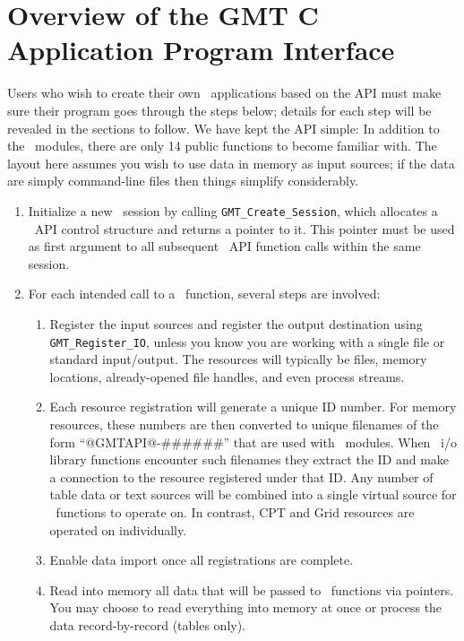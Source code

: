\documentclass{report}
\begin{document}
\chapter{Overview of the GMT C Application Program Interface}

Users who wish to create their own \GMT\ applications based on the API
must make sure their program goes through the steps below; details
for each step will be revealed in the sections to follow.  We have kept the
API simple: In addition to the \GMT\ modules, there are only 14 public functions to become familiar with.
The layout here assumes you wish to use data in memory as input sources; if the data are simply
command-line files then things simplify considerably.

\begin{enumerate}
\item Initialize a new \GMT\ session by calling \texttt{GMT\_Create\_Session}, which
allocates a \GMT\ API control structure and returns a pointer to it.  This pointer must be used
as first argument to all subsequent \GMT\ API function calls within the same session.
\item For each intended call to a \GMT\ function, several steps are involved:
\begin{enumerate}
\item Register the input sources and register the output destination
using \texttt{GMT\_Register\_IO}, unless you know you are working with a single file
or standard input/output.
The resources will typically be files, memory locations, already-opened file handles,
and even process streams.
\item Each resource registration will generate a unique ID number.  For memory resources, these numbers are
then converted to unique filenames of the form ``@GMTAPI@-\#\#\#\#\#\#'' that are used with \GMT\ modules.  When
\GMT\ i/o library functions encounter such filenames they extract the ID and make a connection
to the resource registered under that ID.  Any number of table data or text sources
will be combined into a single virtual source for \GMT\ functions to operate on.
In contrast, CPT and Grid resources are operated on individually.
\item Enable data import once all registrations are complete.
\item Read into memory all data that will be passed to \GMT\ functions via pointers.  You may choose
	to read everything into memory at once or process the data record-by-record (tables only).

\end{enumerate}
\end{enumerate}
\end{document}
